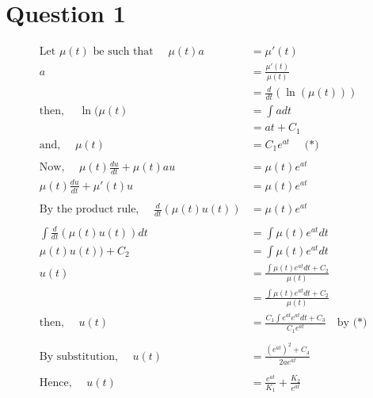 \documentclass[letterpaper,12pt,titlepage,oneside,final]{book}
\begin{document}





\section*{Question 1}

\begin{align*}
\text{Let $\mu(t)$ be such that }\quad
\mu(t) a &= \mu'(t)\\
a &= \frac{\mu'(t)}{\mu(t)}\\
&=\frac{d}{dt}\left(\ln(\mu (t)) \right)\\
\text{then,  }\quad 
\ln(\mu (t) &= \int a dt\\
& = at + C_1 \\
\text{and,  }\quad 
\mu(t) &=  C_1 e^{at} \quad \text{ (*)}\\
\\
\text{Now, }\quad
\mu(t)\frac{du}{dt} + \mu(t) au &= \mu(t) e^{at}\\
\mu(t)\frac{du}{dt} + \mu'(t)u &= \mu(t) e^{at}\\
\\
\text{By the product rule, }\quad
\frac{d}{dt}(\mu(t)u(t)) &= \mu(t) e^{at}\\
\\
\int\frac{d}{dt}(\mu(t)u(t))dt &= \int\mu(t) e^{at}dt\\
\mu(t)u(t)) + C_2 &= \int\mu(t) e^{at}dt\\
u(t)& = \frac{\int\mu(t) e^{at}dt + C_2}{\mu(t)}\\
& = \frac{\int\mu(t) e^{at}dt + C_2}{\mu(t)}\\
\text{then, } \quad 
u(t)& = \frac{C_1 \int  e^{at} e^{at}dt + C_3}{C_1 e^{at}} \quad \text{by (*) }\\
\\
\text{By substitution, }
\quad u(t)& = \frac{(e^{at})^2 + C_4}{2ae^{at}} \\
\\
\text{Hence, } 
\quad u(t) &= \frac{e^{at}}{K_1} + \frac{K_2}{e^{at}} \\
\end{align*}
\clearpage 
\end{document}
